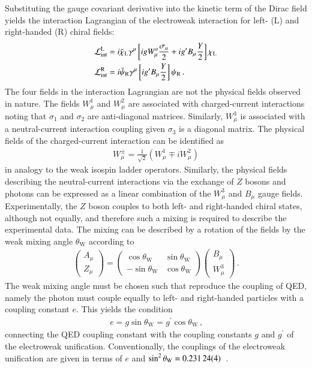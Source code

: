 Substituting the gauge covariant derivative into the kinetic term of the Dirac
field yields the interaction Lagrangian of the electroweak interaction for left-
(L) and right-handed (R) chiral fields:
\begin{align}
  &\mathcal{L}_{\text{int}}^{\text{L}} = i \bar{\chi}_{\text{L}} \gamma^\mu \left[i g W_\mu^a \frac{\sigma_a}{2} + i g^\prime B_\mu \frac{Y}{2} \right] \chi_{\text{L}} \label{eq:theory_electroweak_left} \\
  &\mathcal{L}_{\text{int}}^{\text{R}} = i \bar{\psi}_{\text{R}} \gamma^\mu \left[i g^\prime B_\mu \frac{Y}{2} \right] \psi_{\text{R}} \,\text{.} \label{eq:theory_electroweak_right}
\end{align}
The four fields in the interaction Lagrangian are not the physical fields
observed in nature. The fields $W_\mu^1$ and $W_\mu^2$ are associated with
charged-current interactions noting that $\sigma_1$ and $\sigma_2$ are
anti-diagonal matrices. Similarly, $W_\mu^3$ is associated with a
neutral-current interaction coupling given $\sigma_3$ is a diagonal matrix.  The
physical fields of the charged-current interaction can be identified as
\begin{align*}
  W_\mu^\pm = \frac{1}{\sqrt{2}} (W_\mu^1 \mp i W_\mu^2)
\end{align*}
in analogy to the weak isospin ladder operators. Similarly, the physical fields
describing the neutral-current interactions via the exchange of $Z$ bosons and
photons can be expressed as a linear combination of the $W_\mu^3$ and $B_\mu$
gauge fields. Experimentally, the $Z$ boson couples to both left- and
right-handed chiral states, although not equally, and therefore such a mixing is
required to describe the experimental data. The mixing can be described by a
rotation of the fields by the weak mixing angle $\theta_{\text{W}}$ according to
\begin{align*}
  \begin{pmatrix}
    A_\mu \\
    Z_\mu
  \end{pmatrix}
  =
  \begin{pmatrix}
    \cos\theta_{\text{W}} & \sin\theta_{\text{W}} \\
    -\sin\theta_{\text{W}} & \cos\theta_{\text{W}}
  \end{pmatrix}
  \begin{pmatrix}
    B_\mu \\
    W_\mu^3
  \end{pmatrix} \,\text{.}
\end{align*}
The weak mixing angle must be chosen such that
 reproduce the
coupling of QED, namely the photon must couple equally to left- and right-handed
particles with a coupling constant $e$. This yields the condition
\begin{align*}
  e = g \sin\theta_{\text{W}} = g^\prime \cos\theta_{\text{W}} \,\text{,}
\end{align*}
connecting the QED coupling constant with the coupling constants $g$ and
$g^\prime$ of the electroweak unification. Conventionally, the couplings of the
electroweak unification are given in terms of $e$ and
$\sin^2\theta_{\text{W}} = \num{0.23124 +- 0.00004}$~\cite{pdg2020}.


